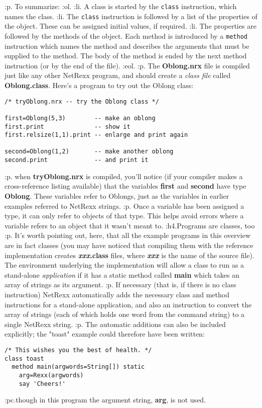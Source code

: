 :p.
To summarize:
:ol.
:li.
A class is started by the \texttt{class} instruction, which names the
class.
:li.
The \texttt{class} instruction is followed by a list of the properties
of the object.  These can be assigned initial values, if required.
:li.
The properties are followed by the methods of the object.  Each
method is introduced by a \texttt{method} instruction which names the
method and describes the arguments that must be supplied to the method.
The body of the method is ended by the next method instruction (or
by the end of the file).
:eol.
:p.
The \textbf{Oblong.nrx} file is compiled just like any other NetRexx
program, and should create a \emph{class file}
called \textbf{Oblong.class}.
Here's a program to try out the Oblong class:
\begin{verbatim}
/* tryOblong.nrx -- try the Oblong class */

first=Oblong(5,3)        -- make an oblong
first.print              -- show it
first.relsize(1,1).print -- enlarge and print again

second=Oblong(1,2)       -- make another oblong
second.print             -- and print it
\end{verbatim}
:p.
when \textbf{tryOblong.nrx} is compiled, you'll notice (if your
compiler makes a cross-reference listing available) that the
variables \textbf{first} and \textbf{second} have
type \textbf{Oblong}.
These variables refer to Oblongs, just as the variables in earlier
examples referred to NetRexx strings.
:p.
Once a variable has been assigned a type, it can only refer to objects
of that type.  This helps avoid errors where a variable refers to an
object that it wasn't meant to.
:h4.Programs are classes, too
:p.
It's worth pointing out, here, that all the example programs in this
overview are in fact classes (you may have noticed that compiling them
with the reference implementation creates \textbf{\emph{xxx}.class}
files, where \textbf{\emph{xxx}} is the name of the source file).
The environment underlying the implementation will allow a class to run
as a stand-alone \emph{application} if it has a static method
called \textbf{main} which takes an array of strings as its argument.
:p.
If necessary (that is, if there is no class instruction) NetRexx
automatically adds the necessary class and method instructions for a
stand-alone application, and also an instruction to convert the array of
strings (each of which holds one word from the command string) to a
single NetRexx string.
:p.
The automatic additions can also be included explicitly; the
"toast" example could therefore have been written:
\begin{verbatim}
/* This wishes you the best of health. */
class toast
  method main(argwords=String[]) static
    arg=Rexx(argwords)
    say 'Cheers!'
\end{verbatim}
:pc.though in this program the argument string, \textbf{arg}, is not
used.

